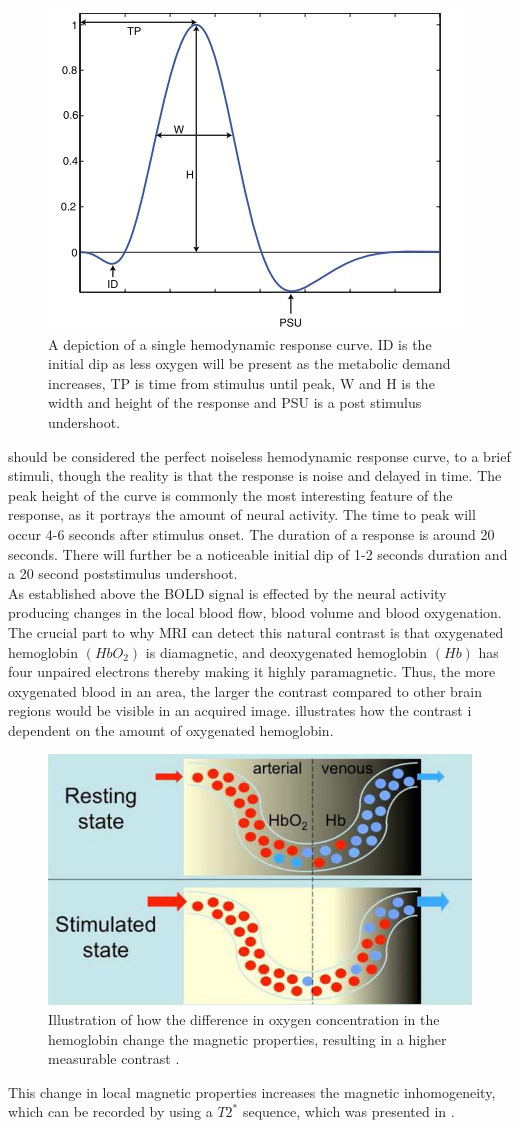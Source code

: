 \begin{figure}[H]                 
	\includegraphics[width=.48\textwidth]{figures/aBackground/HRF}  
	\caption{A depiction of a single hemodynamic response curve. ID is the initial dip as less oxygen will be present as the metabolic demand increases, TP is time from stimulus until peak, W and H is the width and height of the response and PSU is a post stimulus undershoot. \cite{Poldrack2011}}
	\label{fig:back:HRF} 
\end{figure}

 should be considered the perfect noiseless hemodynamic response curve, to a brief stimuli, though the reality is that the response is noise and delayed in time. The peak height of the curve is commonly the most interesting feature of the response, as it portrays the amount of neural activity. The time to peak will occur 4-6 seconds after stimulus onset. The duration of a response is around 20 seconds. There will further be a noticeable initial dip of 1-2 seconds duration and a 20 second poststimulus undershoot. \cite{Poldrack2011}    \\
As established above the BOLD signal is effected by the neural activity producing changes in the local blood flow, blood volume and blood oxygenation. The crucial part to why MRI can detect this natural contrast is that oxygenated hemoglobin $(HbO_2)$ is diamagnetic, and deoxygenated hemoglobin $(Hb)$ has four unpaired electrons thereby making it highly paramagnetic. Thus, the more oxygenated blood in an area, the larger the contrast compared to other brain regions would be visible in an acquired image. \cite{Glover2011,Poldrack2011,Khanna2015}  illustrates how the contrast i dependent on the amount of oxygenated hemoglobin. \cite{Glover2011}

\begin{figure}[H]                 
	\includegraphics[width=.47\textwidth]{figures/aBackground/bold_response}  
	\caption{Illustration of how the difference in oxygen concentration in the hemoglobin change the magnetic properties, resulting in a higher measurable contrast \cite{Glover2011}.}
	\label{fig:back:bold} 
\end{figure}

This change in local magnetic properties increases the magnetic inhomogeneity, which can be recorded by using a $T2^*$ sequence, which was presented in  \cite{Lee2002}.  
